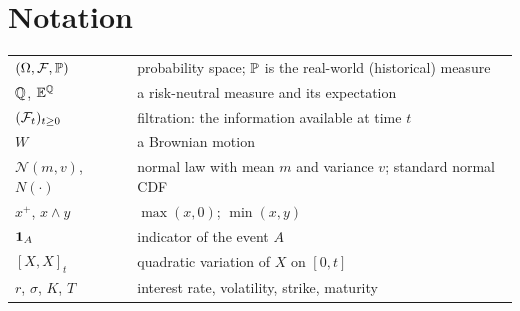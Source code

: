 \section*{Notation}
\begin{center}
\begin{tabular}{@{}ll@{}}
\toprule
$(\Omega,\mathcal{F},\mathbb{P})$ & probability space; $\mathbb{P}$ is the real-world (historical) measure\\
$\mathbb{Q}$, $\mathbb{E}^{\mathbb{Q}}$ & a risk-neutral measure and its expectation\\
$(\mathcal{F}_t)_{t\ge0}$ & filtration: the information available at time $t$\\
$W$ & a Brownian motion\\
$\mathcal N(m,v)$, $N(\cdot)$ & normal law with mean $m$ and variance $v$; standard normal CDF\\
$x^+$, $x\wedge y$ & $\max(x,0)$; $\min(x,y)$\\
$\mathbf{1}_A$ & indicator of the event $A$\\
$[X,X]_t$ & quadratic variation of $X$ on $[0,t]$\\
$r$, $\sigma$, $K$, $T$ & interest rate, volatility, strike, maturity\\
\bottomrule
\end{tabular}
\end{center}

